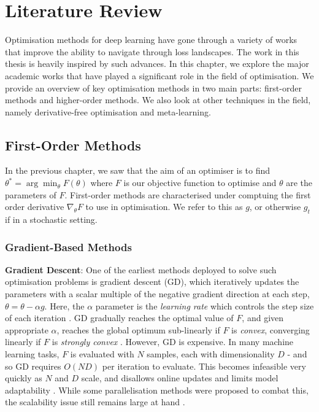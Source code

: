 \chapter{Literature Review}
\label{chap:lit_review}


Optimisation methods for deep learning have gone through a variety of works that improve the ability to navigate through loss landscapes.
The work in this thesis is heavily inspired by such advances. In this chapter, we explore the major academic works that have played a significant role in the field of optimisation. We provide an overview of key optimisation methods in two main parts: first-order methods and higher-order methods. We also look at other techniques in the field, namely derivative-free optimisation and meta-learning.

\section{First-Order Methods}
In the previous chapter, we saw that the aim of an optimiser is to find $\theta^* = \arg\min_{\theta} F(\theta)$ where $F$ is our objective function to optimise and $\theta$ are the parameters of $F$. First-order methods are characterised under comptuing the first order derivative $\nabla_{\theta}F$ to use in optimisation. We refer to this as $g$, or otherwise $g_t$ if in a stochastic setting.

\subsection{Gradient-Based Methods}
\textbf{Gradient Descent}: One of the earliest methods deployed to solve such optimisation problems is gradient descent (GD), which iteratively updates the parameters with a scalar multiple of the negative gradient direction at each step, $\theta = \theta - \alpha g$. Here, the $\alpha$ parameter is the \textit{learning rate} which controls the step size of each iteration \citep{ruder2016overview}. GD gradually reaches the optimal value of $F$, and given appropriate $\alpha$, reaches the global optimum sub-linearly if $F$ is \textit{convex}, converging linearly if $F$ is \textit{strongly convex} \citep{NoceWrig06}. However, GD is expensive. In many machine learning tasks, $F$ is evaluated with $N$ samples, each with dimensionality $D$ - and so GD requires $O(ND)$ per iteration to evaluate. This becomes infeasible very quickly as $N$ and $D$ scale, and disallows online updates and limits model adaptability \citep{ruder2016overview}. While some parallelisation methods were proposed to combat this, the scalability issue still remains large at hand \citep{alspector1992parallel,NoceWrig06}.

